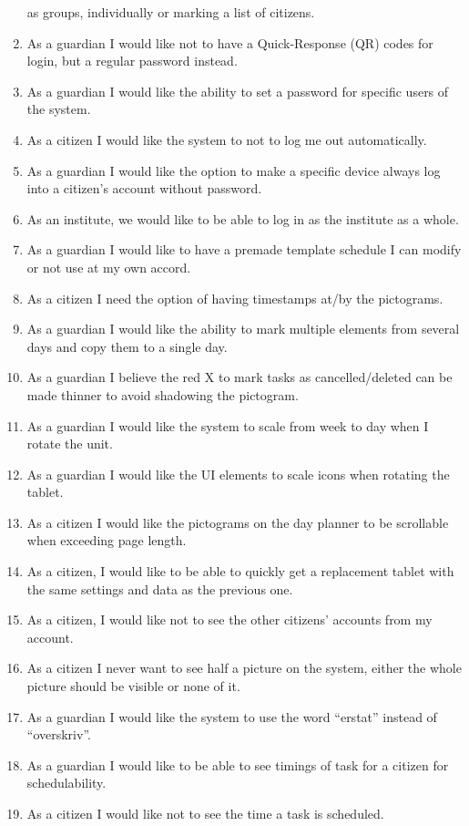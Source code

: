 \begin{enumerate}
as groups, individually or marking a list of citizens.
  \item As a guardian I would like not to have a Quick-Response (QR) codes for
login, but a regular password instead.
  \item As a guardian I would like the ability to set a password for specific
users of the system.
  \item As a citizen I would like the system to not to log me out automatically.
  \item As a guardian I would like the option to make a specific device always
log into a citizen's account without password.
  \item As an institute, we would like to be able to log in as the institute as
a whole.
  \item As a guardian I would like to have a premade template schedule I can
modify or not use at my own accord.
  \item As a citizen I need the option of having timestamps at/by the
pictograms.
  \item As a guardian I would like the ability to mark multiple elements from
several days and copy them to a single day.
  \item As a guardian I believe the red X to mark tasks as cancelled/deleted can
be made thinner to avoid shadowing the pictogram.
  \item As a guardian I would like the system to scale from week to day when I
rotate the unit.
  \item As a guardian I would like the UI elements to scale icons when rotating
the tablet.
  \item As a citizen I would like the pictograms on the day planner to be
scrollable when exceeding page length.
  \item As a citizen, I would like to be able to quickly get a replacement
tablet with the same settings and data as the previous one.
  \item As a citizen, I would like not to see the other citizens’ accounts from
my account.
  \item As a citizen I never want to see half a picture on the system, either
the whole picture should be visible or none of it.
  \item As a guardian I would like the system to use the word “erstat” instead
of “overskriv”.
  \item As a guardian I would like to be able to see timings of task for a
citizen for schedulability.
  \item As a citizen I would like not to see the time a task is scheduled.

\end{enumerate}
